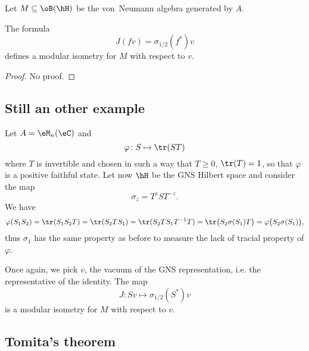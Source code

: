 Let $M\subseteq\oB(\hH)$ be the von~Neumann algebra generated by $A$.
\begin{proposition}
	The formula
	\begin{equation}
		J(fv)=\sigma_{1/2}(f^*)v
	\end{equation}
	defines a modular isometry for $M$ with respect to $v$.
\end{proposition}

\begin{proof}
	No proof.
\end{proof}

\subsection{Still an other example}

Let $A=\eM_n(\eC)$ and
\begin{equation}
	\varphi\colon S\mapsto \tr(ST)
\end{equation}
where $T$ is invertible and chosen in such a way that $T\geq0$, $\tr(T)=1$, so that $\varphi$ is a positive faithful state. Let now $\hH$ be the GNS Hilbert space and consider the map
\begin{equation}
	\sigma_z=T^zST^{-z}.
\end{equation}
We have
\begin{equation}
	\varphi(S_1S_2)=\tr(S_1S_2T)=\tr(S_2TS_1)=\tr(S_2TS_1T^{-1}T)=\tr\big( S_2\sigma(S_1)T \big)=\varphi\big( S_2\sigma(S_1) \big),
\end{equation}
thus $\sigma_1$ has the same property as before to measure the lack of tracial property of $\varphi$.

Once again, we pick $v$, the vacuum of the GNS representation, i.e. the representative of the identity. The map
\begin{equation}
	J\colon Sv\mapsto \sigma_{1/2}(S^*)v
\end{equation}
is a modular isometry for $M$ with respect to $v$.


\subsection{Tomita's theorem}

